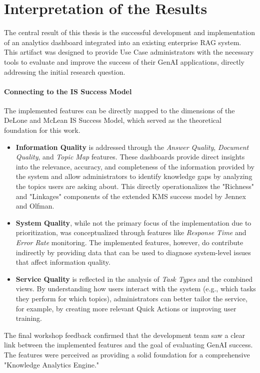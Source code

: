 \documentclass[
	english,
	ruledheaders=section,%
	class=report,%
	thesis={type=bachelor},%
	accentcolor=1b,%
	custommargins=true,%
	marginpar=false,%
	parskip=half-,%
	fontsize=11pt,%
	DIV=14,
]{tudapub}
\begin{document}
\section{Interpretation of the Results}
The central result of this thesis is the successful development and implementation of an analytics dashboard integrated into an existing enterprise RAG system. This artifact was designed to provide Use Case administrators with the necessary tools to evaluate and improve the success of their GenAI applications, directly addressing the initial research question.

\paragraph{Connecting to the IS Success Model} The implemented features can be directly mapped to the dimensions of the DeLone and McLean IS Success Model, which served as the theoretical foundation for this work.
\begin{itemize}
    \item \textbf{Information Quality} is addressed through the \textit{Answer Quality}, \textit{Document Quality}, and \textit{Topic Map} features. These dashboards provide direct insights into the relevance, accuracy, and completeness of the information provided by the system and allow administrators to identify knowledge gaps by analyzing the topics users are asking about. This directly operationalizes the "Richness" and "Linkages" components of the extended KMS success model by Jennex and Olfman.
    \item \textbf{System Quality}, while not the primary focus of the implementation due to prioritization, was conceptualized through features like \textit{Response Time} and \textit{Error Rate} monitoring. The implemented features, however, do contribute indirectly by providing data that can be used to diagnose system-level issues that affect information quality.
    \item \textbf{Service Quality} is reflected in the analysis of \textit{Task Types} and the combined views. By understanding how users interact with the system (e.g., which tasks they perform for which topics), administrators can better tailor the service, for example, by creating more relevant Quick Actions or improving user training.
\end{itemize}
The final workshop feedback confirmed that the development team saw a clear link between the implemented features and the goal of evaluating GenAI success. The features were perceived as providing a solid foundation for a comprehensive "Knowledge Analytics Engine."
\end{document}
